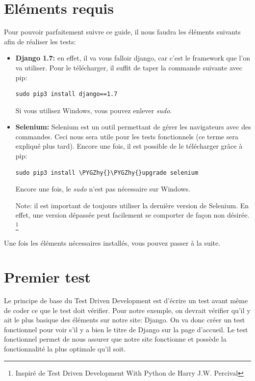 \documentclass[letterpaper,10pt,french]{sphinxmanual}
\def\PYGZhy{\char`\-}
\begin{document}
\section{Eléments requis}
\label{projet1:elements-requis}
Pour pouvoir parfaitement suivre ce guide, il nous faudra les éléments suivants afin de réaliser les tests:
\begin{itemize}
\item {} 
\textbf{Django 1.7:} en effet, il va vous falloir django, car c'est le framework que l'on va utiliser. Pour le télécharger,
il suffit de taper la commande suivante avec pip:

\begin{Verbatim}[commandchars=\\\{\}]
sudo pip3 install django==1.7
\end{Verbatim}

Si vous utilisez Windows, vous pouvez enlever \emph{sudo}.

\item {} 
\textbf{Selenium:} Selenium est un outil permettant de gérer les navigateurs avec des commandes. Ceci nous sera utile pour les
tests fonctionnels (ce terme sera expliqué plus tard). Encore une fois, il est possible de le télécharger grâce à pip:

\begin{Verbatim}[commandchars=\\\{\}]
sudo pip3 install \PYGZhy{}\PYGZhy{}upgrade selenium
\end{Verbatim}

Encore une fois, le \emph{sudo} n'est pas nécessaire sur Windows.

Note: il est important de toujours utiliser la dernière version de Selenium. En effet, une version dépassée peut facilement se comporter de
façon non désirée. \footnote{
Inspiré de Test Driven Development With Python de Harry J.W. Percival
}

\end{itemize}

Une fois les éléments nécessaires installés, vous pouvez passer à la suite.


\section{Premier test}
\label{projet1:premier-test}
Le principe de base du Test Driven Development est d'écrire un test avant même de coder ce que le test doit vérifier. Pour notre exemple,
on devrait vérifier qu'il y ait le plus basique des éléments sur notre site: Django. On va donc créer un test fonctionnel pour voir s'il y a bien
le titre de Django sur la page d'accueil. Le test fonctionnel permet de nous assurer que notre site fonctionne et possède
la fonctionnalité la plus optimale qu'il soit.
\end{document}
